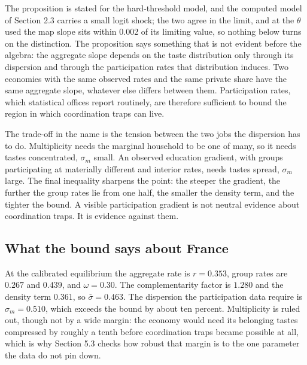 \documentclass[11pt]{article}
\begin{document}
The proposition is stated for the hard-threshold model, and the computed model of Section 2.3 carries a small logit shock; the two agree in the limit, and at the $\theta$ used the map slope sits within 0.002 of its limiting value, so nothing below turns on the distinction. The proposition says something that is not evident before the algebra: the aggregate slope depends on the taste distribution only through its dispersion and through the participation rates that distribution induces. Two economies with the same observed rates and the same private share have the same aggregate slope, whatever else differs between them. Participation rates, which statistical offices report routinely, are therefore sufficient to bound the region in which coordination traps can live.

The trade-off in the name is the tension between the two jobs the dispersion has to do. Multiplicity needs the marginal household to be one of many, so it needs tastes concentrated, $\sigma_m$ small. An observed education gradient, with groups participating at materially different and interior rates, needs tastes spread, $\sigma_m$ large. The final inequality sharpens the point: the steeper the gradient, the further the group rates lie from one half, the smaller the density term, and the tighter the bound. A visible participation gradient is not neutral evidence about coordination traps. It is evidence against them.

\subsection{What the bound says about France}

At the calibrated equilibrium the aggregate rate is $r = 0.353$, group rates are $0.267$ and $0.439$, and $\omega = 0.30$. The complementarity factor is $1.280$ and the density term $0.361$, so $\bar\sigma = 0.463$. The dispersion the participation data require is $\sigma_m = 0.510$, which exceeds the bound by about ten percent. Multiplicity is ruled out, though not by a wide margin: the economy would need its belonging tastes compressed by roughly a tenth before coordination traps became possible at all, which is why Section 5.3 checks how robust that margin is to the one parameter the data do not pin down.
\end{document}
